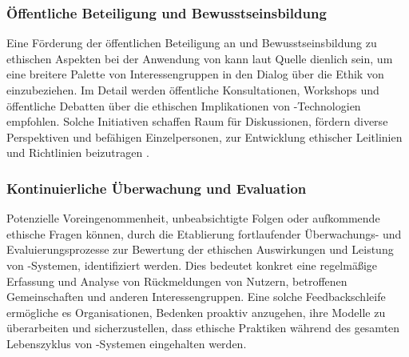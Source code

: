 \documentclass[hidelinks,12pt]{report}
\begin{document}
\subsubsection{Öffentliche Beteiligung und Bewusstseinsbildung}
Eine Förderung der öffentlichen Beteiligung an und Bewusstseinsbildung zu ethischen Aspekten bei der Anwendung von  kann laut Quelle \cite{WILSON2022101652} dienlich sein, um eine breitere Palette von Interessengruppen in den Dialog über die Ethik von  einzubeziehen. Im Detail werden öffentliche Konsultationen, Workshops und öffentliche Debatten über die ethischen Implikationen von -Technologien empfohlen. Solche Initiativen schaffen Raum für Diskussionen, fördern diverse Perspektiven und befähigen Einzelpersonen, zur Entwicklung ethischer Leitlinien und Richtlinien beizutragen \cite{WILSON2022101652}.

\newpage

\subsubsection{Kontinuierliche Überwachung und Evaluation}
Potenzielle Voreingenommenheit, unbeabsichtigte Folgen oder aufkommende ethische Fragen können, durch die Etablierung fortlaufender Überwachungs- und Evaluierungsprozesse zur Bewertung der ethischen Auswirkungen und Leistung von -Systemen, identifiziert werden. Dies bedeutet konkret eine regelmäßige Erfassung und Analyse von Rückmeldungen von Nutzern, betroffenen Gemeinschaften und anderen Interessengruppen. Eine solche Feedbackschleife ermögliche es Organisationen, Bedenken proaktiv anzugehen, ihre Modelle zu überarbeiten und sicherzustellen, dass ethische Praktiken während des gesamten Lebenszyklus von -Systemen eingehalten werden.
\\
\end{document}
